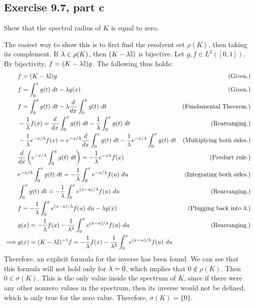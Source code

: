 \newpage
\subsection{Exercise 9.7, part c}
Show that the spectral radius of $K$ is equal to zero. 
\partbreak
\begin{solution}

    The easiest way to show this is to first find the resolvent set $\rho(K)$, then taking its complement. If $\mathrm{\lambda} \in \rho(K)$, then $(K - \mathrm{\lambda}\mathbb{I})$ is bijective. Let $g, f \in L^2([0, 1])$. By bijectivity, $f = (K - \mathrm{\lambda} \mathbb{I}) g$. The following thus holds:
    \tightalignbreak
    \begin{align*}
        &f = (K - \mathrm{\lambda} \mathbb{I}) g &\text{(Given.)}\\
        &f = \int_0^x g(t) \ dt - \mathrm{\lambda} g(x) &\text{(Given.)}\\
        &f = \int_0^x g(t) \ dt - \mathrm{\lambda} \frac{d}{dx}\int_0^xg(t) \ dt &\text{(Fundamental Theorem.)}\\
        &-\frac{1}{\mathrm{\lambda}}f(x) = \frac{d}{dx}\int_0^xg(t) \ dt - \frac{1}{\mathrm{\lambda}} \int_0^x g(t) \ dt &\text{(Rearranging.)}\\
        &-\frac{1}{\mathrm{\lambda}}e^{-x/\mathrm{\lambda}}f(x) = e^{-x/\mathrm{\lambda}}\frac{d}{dx}\int_0^xg(t) \ dt - \frac{1}{\mathrm{\lambda}}e^{-x/\mathrm{\lambda}} \int_0^x g(t) \ dt &\text{(Multiplying both sides.)}\\
        &\frac{d}{dx}\left(e^{-x/\mathrm{\lambda}}\int_0^x g(t) \ dt\right) = -\frac{1}{\mathrm{\lambda}} e^{-x\mathrm{\lambda}}f(x) &\text{(Product rule.)}\\
        &e^{-x/\mathrm{\lambda}}\int_0^x g(t) \ dt = -\frac{1}{\mathrm{\lambda}}\int_0^x e^{-u/\mathrm{\lambda}}f(u) \ du &\text{(Integrating both sides.)}\\
        &\int_0^x g(t) \ dt = -\frac{1}{\mathrm{\lambda}}\int_0^x e^{(x-u)/\mathrm{\lambda}}f(u) \ du &\text{(Rearranging.)}\\
        &f = -\frac{1}{\mathrm{\lambda}}\int_0^x e^{(x - u) / \mathrm{\lambda}} f(u) \ du  - \mathrm{\lambda} g(x) &\text{(Plugging back into 3.)}\\
        &g(x) = -\frac{1}{\mathrm{\lambda}} f(x) - \frac{1}{\mathrm{\lambda}^2}\int_0^x e^{(x - u)/\mathrm{\lambda}}f(u) \ du &\text{(Rearranging.)}\\
        \implies & g(x) = (K - \mathrm{\lambda}\mathbb{I})^{-1} f=   -\frac{1}{\mathrm{\lambda}} f(x) - \frac{1}{\mathrm{\lambda}^2}\int_0^x e^{(x - u)/\mathrm{\lambda}}f(u) \ du  
    \end{align*}
    \vspace{-12mm}\alignbreak
    Therefore, an explicit formula for the inverse has been found. We can see that this formula will not hold only for $\mathrm{\lambda} = 0$, which implies that $0 \not \in \rho(K)$. Then $0 \in \sigma(K)$. This is the only value inside the spectrum of $K$, since if there were any other nonzero values in the spectrum, then its inverse would not be defined, which is only true for the zero value. Therefore, $\sigma(K) = \{0\}.$
\end{solution}
\newpage
